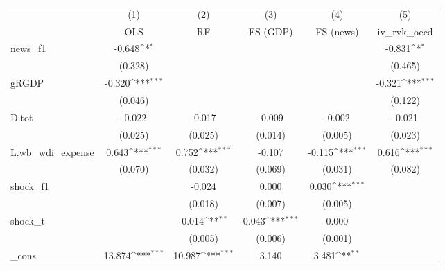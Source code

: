 {
\def\sym#1{\ifmmode^{#1}\else\(^{#1}\)\fi}
\begin{tabular}{l*{5}{c}}
\toprule
            &\multicolumn{1}{c}{(1)}&\multicolumn{1}{c}{(2)}&\multicolumn{1}{c}{(3)}&\multicolumn{1}{c}{(4)}&\multicolumn{1}{c}{(5)}\\
            &\multicolumn{1}{c}{OLS}&\multicolumn{1}{c}{RF}&\multicolumn{1}{c}{FS (GDP)}&\multicolumn{1}{c}{FS (news)}&\multicolumn{1}{c}{iv\_rvk\_oecd}\\
\midrule
news\_f1     &      -0.648\sym{*}  &                     &                     &                     &      -0.831\sym{*}  \\
            &     (0.328)         &                     &                     &                     &     (0.465)         \\
\addlinespace
gRGDP       &      -0.320\sym{***}&                     &                     &                     &      -0.321\sym{***}\\
            &     (0.046)         &                     &                     &                     &     (0.122)         \\
\addlinespace
D.tot       &      -0.022         &      -0.017         &      -0.009         &      -0.002         &      -0.021         \\
            &     (0.025)         &     (0.025)         &     (0.014)         &     (0.005)         &     (0.023)         \\
\addlinespace
L.wb\_wdi\_expense&       0.643\sym{***}&       0.752\sym{***}&      -0.107         &      -0.115\sym{***}&       0.616\sym{***}\\
            &     (0.070)         &     (0.032)         &     (0.069)         &     (0.031)         &     (0.082)         \\
\addlinespace
shock\_f1    &                     &      -0.024         &       0.000         &       0.030\sym{***}&                     \\
            &                     &     (0.018)         &     (0.007)         &     (0.005)         &                     \\
\addlinespace
shock\_t     &                     &      -0.014\sym{**} &       0.043\sym{***}&       0.000         &                     \\
            &                     &     (0.005)         &     (0.006)         &     (0.001)         &                     \\
\addlinespace
\_cons      &      13.874\sym{***}&      10.987\sym{***}&       3.140         &       3.481\sym{**} &                     \\

\end{tabular}}
